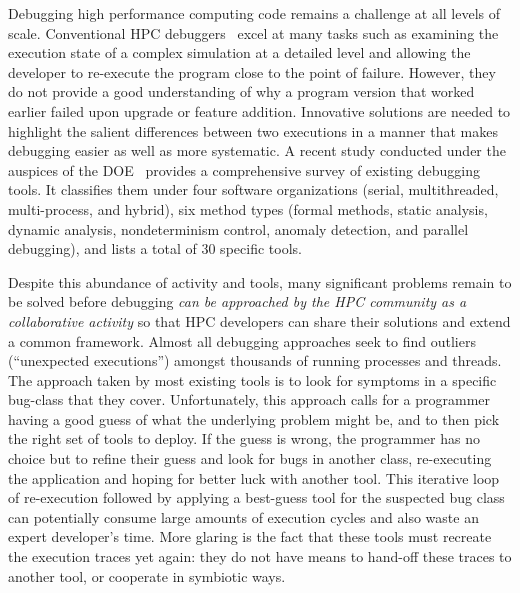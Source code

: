 

Debugging high performance computing code
remains a challenge at all levels of scale.
%
Conventional HPC debuggers~\cite{allinea-ddt,roguewave,others}
excel at many tasks such as examining the execution
state of a complex simulation at a detailed
level and allowing the developer to re-execute
the program close to the point of failure.
%
However, they do not provide a good understanding
of why a program version that worked earlier
failed upon upgrade or feature addition.
%
Innovative solutions are needed to highlight the
salient differences between two executions in a manner
that makes debugging easier as well as more systematic.
%
A recent study conducted under the auspices of the
DOE~\cite{DBLP:journals/corr/GopalakrishnanH17}
provides a comprehensive survey
of existing debugging tools.
%
It classifies them under
four software organizations (serial, multithreaded,
multi-process, and hybrid), six
method types (formal methods, static analysis, dynamic
analysis, nondeterminism control, anomaly detection,
and parallel debugging), and lists a total of 30 specific
tools.


Despite this abundance of activity and tools, many
significant problems remain to be solved before debugging
{\em can be approached by the HPC community as a collaborative
activity} so that HPC developers can share their solutions
and extend a common framework.
%
Almost all debugging approaches seek to find outliers (``unexpected
executions'') amongst thousands of running processes and threads.
%
The approach taken by most existing tools is to
look for symptoms in a specific bug-class that they cover.
%
Unfortunately,
this approach calls for a programmer having a good guess of what
the underlying problem might be,
and to then pick the right set of tools to deploy.
%
If the guess is wrong, the programmer has no choice but to
refine their guess
and look for bugs in another class,
re-executing the application and hoping for
better luck with another tool.
%
This iterative loop of re-execution followed by applying a
best-guess tool for the suspected bug class can potentially consume
large amounts of execution cycles and also waste an
expert developer's time.
%
More glaring is the fact that these tools must recreate the
execution traces yet again: they do not have means to hand-off
these traces to another tool, or cooperate in symbiotic ways.



